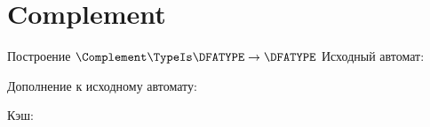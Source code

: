 \section{Complement}
\begin{frame}{Построение $\Complement\TypeIs\DFATYPE\to\DFATYPE$}
	Исходный автомат:


	Дополнение к исходному автомату:


	Кэш:


\end{frame}

